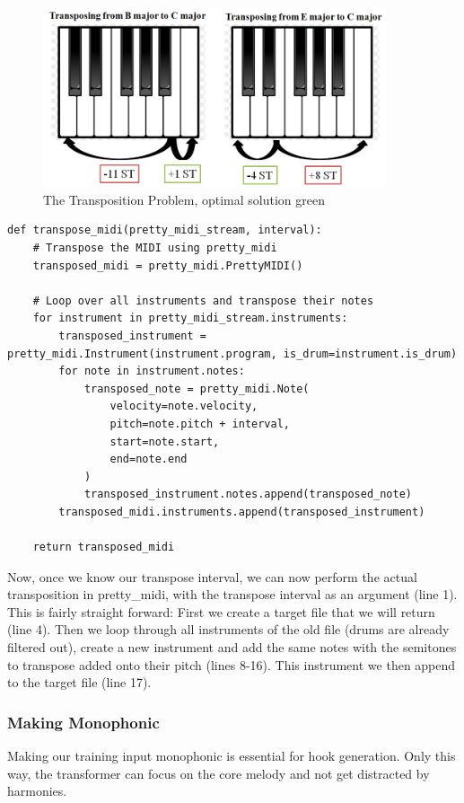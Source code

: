 \documentclass[a4paper,12pt]{extarticle}
\begin{document}
\begin{figure}[H] %
    \centering
    \includegraphics[width=0.9\textwidth]{transposing2.png} %
    \caption{The Transposition Problem, optimal solution green}
    \label{fig:transp}
\end{figure}

\begin{lstlisting}
def transpose_midi(pretty_midi_stream, interval):
    # Transpose the MIDI using pretty_midi
    transposed_midi = pretty_midi.PrettyMIDI()

    # Loop over all instruments and transpose their notes
    for instrument in pretty_midi_stream.instruments:
        transposed_instrument = pretty_midi.Instrument(instrument.program, is_drum=instrument.is_drum)
        for note in instrument.notes:
            transposed_note = pretty_midi.Note(
                velocity=note.velocity,
                pitch=note.pitch + interval,
                start=note.start,
                end=note.end
            )
            transposed_instrument.notes.append(transposed_note)
        transposed_midi.instruments.append(transposed_instrument)

    return transposed_midi
\end{lstlisting} 
Now, once we know our transpose interval, we can now perform the actual transposition in pretty\_midi, with the transpose interval as an argument (line 1). This is fairly straight forward: First we create a target file that we will return (line 4). Then we loop through all instruments of the old file (drums are already filtered out), create a new instrument and add the same notes with the semitones to transpose added onto their pitch (lines 8-16). This instrument we then append to the target file (line 17).

\subsubsection{Making Monophonic}
Making our training input monophonic is essential for hook generation. Only this way, the transformer can focus on the core melody and not get distracted by harmonies. \newline
\end{document}
